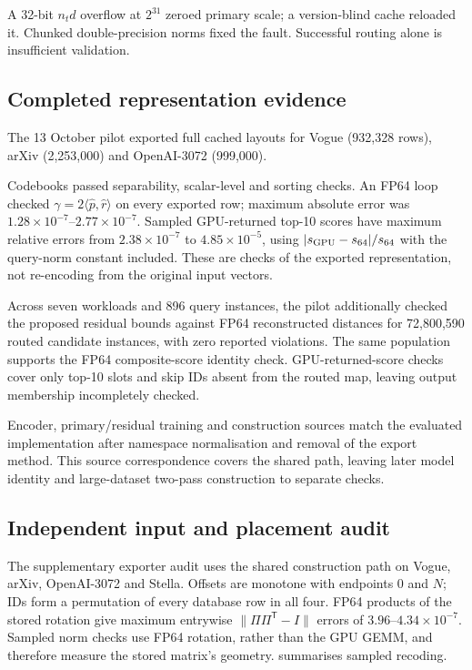 A 32-bit $n_td$ overflow at $2^{31}$ zeroed primary scale; a version-blind cache reloaded it. Chunked double-precision norms fixed the fault. Successful routing alone is insufficient validation.

\subsection{Completed representation evidence}

The 13 October pilot exported full cached layouts for Vogue (932,328 rows), arXiv (2,253,000) and OpenAI-3072 (999,000).

Codebooks passed separability, scalar-level and sorting checks. An FP64 loop checked $\gamma=2\langle\widehat p,\widehat r\rangle$ on every exported row; maximum absolute error was $1.28\times10^{-7}$--$2.77\times10^{-7}$. Sampled GPU-returned
top-10 scores have maximum relative errors from $2.38\times10^{-7}$ to
$4.85\times10^{-5}$, using $|s_{\rm GPU}-s_{64}|/s_{64}$ with the
query-norm constant included. These are checks of the exported
representation, not re-encoding from the original input vectors.


Across seven workloads and 896 query instances, the pilot additionally
checked the proposed residual bounds against FP64 reconstructed distances
for 72,800,590 routed candidate instances, with zero reported violations.
The same population supports the FP64 composite-score identity check.
GPU-returned-score checks cover only top-10 slots and skip IDs absent
from the routed map, leaving output membership incompletely checked.

Encoder, primary/residual training and construction sources match the
evaluated implementation after namespace normalisation and removal of
the export method. This source
correspondence covers the shared path, leaving later model identity and
large-dataset two-pass construction to separate checks.

\subsection{Independent input and placement audit}
\label{sec:4-representation-audit}

The supplementary exporter audit uses the shared construction path on
Vogue, arXiv, OpenAI-3072 and Stella. Offsets are monotone with endpoints
0 and $N$; IDs form a permutation of every database row in all four.
FP64 products of the stored rotation give maximum entrywise
$\|\Pi\Pi^{\mathsf T}-I\|$ errors of $3.96$--$4.34\times10^{-7}$.
Sampled norm checks use FP64 rotation, rather than the GPU GEMM, and
therefore measure the stored matrix's geometry.
 summarises sampled recoding.

